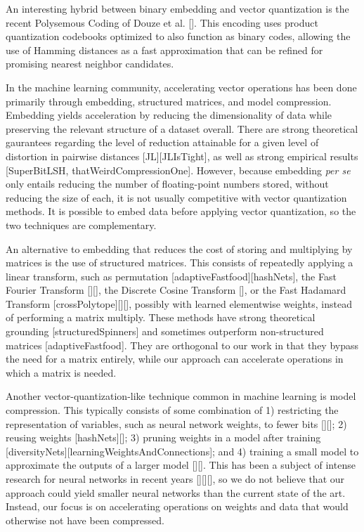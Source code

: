 An interesting hybrid between binary embedding and vector quantization is the recent Polysemous Coding of Douze et al. []. This encoding uses product quantization codebooks optimized to also function as binary codes, allowing the use of Hamming distances as a fast approximation that can be refined for promising nearest neighbor candidates. %

In the machine learning community, accelerating vector operations has been done primarily through embedding, structured matrices, and model compression. Embedding yields acceleration by reducing the dimensionality of data while preserving the relevant structure of a dataset overall. There are strong theoretical gaurantees regarding the level of reduction attainable for a given level of distortion in pairwise distances [JL][JLIsTight], as well as strong empirical results [SuperBitLSH, thatWeirdCompressionOne]. However, because embedding \textit{per se} only entails reducing the number of floating-point numbers stored, without reducing the size of each, it is not usually competitive with vector quantization methods. It is possible to embed data before applying vector quantization, so the two techniques are complementary.

An alternative to embedding that reduces the cost of storing and multiplying by matrices is the use of structured matrices. This consists of repeatedly applying a linear transform, such as permutation [adaptiveFastfood][hashNets], the Fast Fourier Transform [][], the Discrete Cosine Transform [], or the Fast Hadamard Transform [crossPolytope][][], possibly with learned elementwise weights, instead of performing a matrix multiply. These methods have strong theoretical grounding [structuredSpinners] and sometimes outperform non-structured matrices [adaptiveFastfood]. They are orthogonal to our work in that they bypass the need for a matrix entirely, while our approach can accelerate operations in which a matrix is needed.

Another vector-quantization-like technique common in machine learning is model compression. This typically consists of some combination of 1) restricting the representation of variables, such as neural network weights, to fewer bits [][]; 2) reusing weights [hashNets][]; 3) pruning weights in a model after training [diversityNets][learningWeightsAndConnections]; and 4) training a small model to approximate the outputs of a larger model [][]. This has been a subject of intense research for neural networks in recent years [][][], so we do not believe that our approach could yield smaller neural networks than the current state of the art. Instead, our focus is on accelerating operations on weights and data that would otherwise not have been compressed.%

